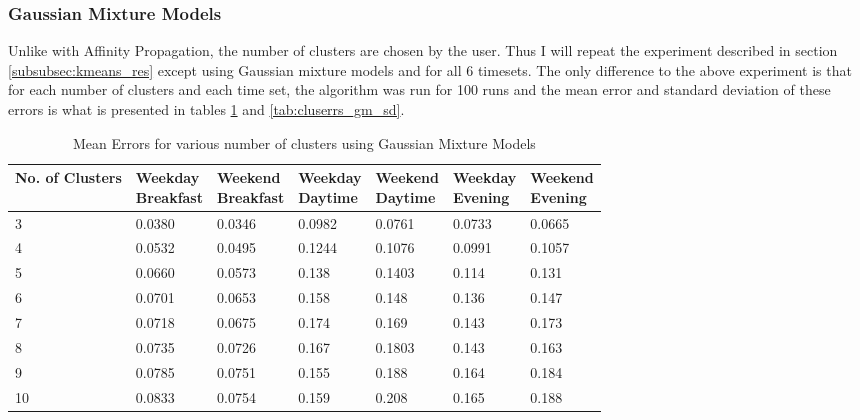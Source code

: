\documentclass[a4paper]{article}
\begin{document}
\subsubsection{Gaussian Mixture Models} \label{subsubsec:gm_res}
Unlike with Affinity Propagation, the number of clusters are chosen by the user. Thus I will repeat the experiment described in section \ref{subsubsec:kmeans_res} except using Gaussian mixture models and for all 6 timesets. The only difference to the above experiment is that for each number of clusters and each time set, the algorithm was run for 100 runs and the mean error and standard deviation of these errors is what is presented in tables \ref{tab:cluserrs_gm} and \ref{tab:cluserrs_gm_sd}.

\begin{table}
\centering
\begin{tabular}{|l|l|l|l|l|l|l|}
\hline
\textbf{No. of Clusters} & \thead{\textbf{Weekday} \\ \textbf{Breakfast}} &\thead{\textbf{Weekend} \\ \textbf{ Breakfast}} &\thead{\textbf{Weekday} \\ \textbf{Daytime}} &\thead{\textbf{Weekend} \\ \textbf{Daytime}} &\thead{\textbf{Weekday} \\ \textbf{Evening}} &\thead{\textbf{Weekend} \\ \textbf{Evening}} \\
\hline
3 & 0.0380 & 0.0346 & 0.0982 & 0.0761 & 0.0733 & 0.0665 \\
\hline
4  & 0.0532 & 0.0495 & 0.1244 & 0.1076 & 0.0991 & 0.1057 \\
\hline
5 & 0.0660 & 0.0573 & 0.138 & 0.1403 & 0.114 & 0.131 \\
\hline
6 & 0.0701 & 0.0653 & 0.158 & 0.148 & 0.136 & 0.147 \\
\hline
7 & 0.0718 & 0.0675 & 0.174 & 0.169 & 0.143 & 0.173 \\
\hline
8 & 0.0735 & 0.0726 & 0.167 & 0.1803 & 0.143 & 0.163 \\
\hline
9 & 0.0785 & 0.0751 & 0.155 & 0.188 & 0.164 & 0.184 \\
\hline
10 & 0.0833 & 0.0754 & 0.159 & 0.208 & 0.165 & 0.188 \\
\hline
\end{tabular}
\caption{Mean Errors for various number of clusters using Gaussian Mixture Models}
\label{tab:cluserrs_gm}
\end{table}
\end{document}
